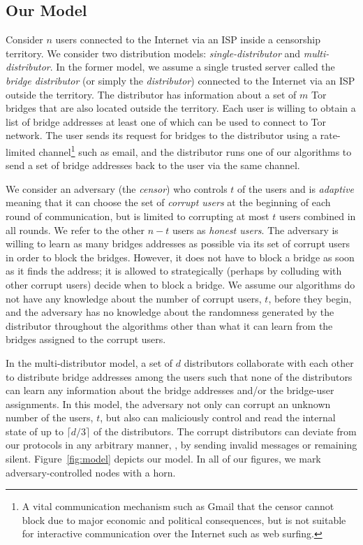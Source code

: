 \subsection{Our Model} \label{sec:model}
Consider $n$ users connected to the Internet via an ISP inside a censorship territory. We consider two distribution models: \emph{single-distributor} and \emph{multi-distributor}. In the former model, we assume a single trusted server called the \emph{bridge distributor} (or simply the \emph{distributor}) connected to the Internet via an ISP outside the territory. The distributor has information about a set of $m$ Tor bridges that are also located outside the territory. Each user is willing to obtain a list of bridge addresses at least one of which can be used to connect to Tor network. The user sends its request for bridges to the distributor using a rate-limited channel\footnote{A vital communication mechanism such as Gmail that the censor cannot block due to major economic and political consequences, but is not suitable for interactive communication over the Internet such as web surfing.} such as email, and the distributor runs one of our algorithms to send a set of bridge addresses back to the user via the same channel.

We consider an adversary (the \emph{censor}) who controls $t$ of the users and is \emph{adaptive} 	 meaning that it can choose the set of \emph{corrupt users} at the beginning of each round of communication, but is limited to corrupting at most $t$ users combined in all rounds. We refer to the other ${n-t}$ users as \emph{honest users}.
The adversary is willing to learn as many bridges addresses as possible via its set of corrupt users in order to block the bridges. However, it does not have to block a bridge as soon as it finds the address; it is allowed to strategically (perhaps by colluding with other corrupt users) decide when to block a bridge. We assume our algorithms do not have any knowledge about the number of corrupt users, $t$, before they begin, and the adversary has no knowledge about the randomness generated by the distributor throughout the algorithms other than what it can learn from the bridges assigned to the corrupt users.

In the multi-distributor model, a set of $d$ distributors collaborate with each other to distribute bridge addresses among the users such that none of the distributors can learn any information about the bridge addresses and/or the bridge-user assignments. In this model, the adversary not only can corrupt an unknown number of the users, $t$, but also can maliciously control and read the internal state of up to $\lceil d/3 \rceil$ of the distributors. The corrupt distributors can deviate from our protocols in any arbitrary manner, \eg, by sending invalid messages or remaining silent. Figure~\ref{fig:model} depicts our model. In all of our figures, we mark adversary-controlled nodes with a horn.

